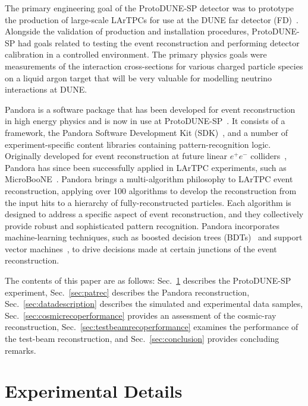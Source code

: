 \documentclass[epjc3]{svjour3}
\begin{document}
The primary engineering goal of the ProtoDUNE-SP detector was to prototype the production of large-scale LArTPCs for use at the DUNE far detector (FD)~\cite{dunetdr_v4}. Alongside the validation of production and installation procedures, ProtoDUNE-SP had goals related to testing the event reconstruction and performing detector calibration in a controlled environment. The primary physics goals were measurements of the interaction cross-sections for various charged particle species on a liquid argon target that will be very valuable for modelling neutrino interactions at DUNE.

Pandora is a software package that has been developed for event reconstruction in high energy physics and is now in use at ProtoDUNE-SP~\cite{proto_performance}. It consists of a framework, the Pandora Software Development Kit (SDK)~\cite{pandorasdk}, and a number of experiment-specific content libraries containing pattern-recognition logic. Originally developed for event reconstruction at future linear $e^{+}e^{-}$ colliders~\cite{pandorailc,pandoraclic}, Pandora has since been successfully applied in LArTPC experiments, such as MicroBooNE~\cite{pandorauboone}. Pandora brings a multi-algorithm philosophy to LArTPC event reconstruction, applying over 100 algorithms to develop the reconstruction from the input hits to a hierarchy of fully-reconstructed particles. Each algorithm is designed to address a specific aspect of event reconstruction, and they collectively provide robust and sophisticated pattern recognition. Pandora incorporates machine-learning techniques, such as boosted decision trees (BDTs)~\cite{bdtOriginal,bdtBoost} and support vector machines~\cite{cortes1995support}, to drive decisions made at certain junctions of the event reconstruction. 

The contents of this paper are as follows: Sec.~\ref{sec:expdets} describes the ProtoDUNE-SP experiment, Sec.~\ref{sec:patrec} describes the Pandora reconstruction, Sec.~\ref{sec:datadescription} describes the simulated and experimental data samples, Sec.~\ref{sec:cosmicrecoperformance} provides an assessment of the cosmic-ray reconstruction, Sec.~\ref{sec:testbeamrecoperformance} examines the performance of the test-beam reconstruction, and Sec.~\ref{sec:conclusion} provides concluding remarks.

\section{Experimental Details}
\label{sec:expdets}
\end{document}
